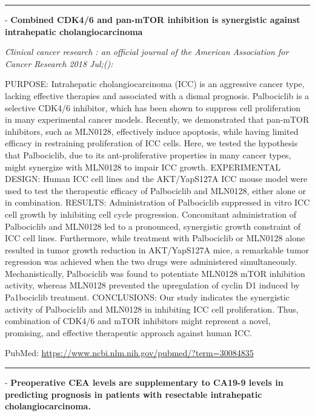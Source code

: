 \documentclass[]{article}
\begin{document}
\begin{center}\rule{0.5\linewidth}{\linethickness}\end{center}

 - \textbf{Combined CDK4/6 and pan-mTOR inhibition is synergistic
against intrahepatic cholangiocarcinoma}

\emph{Clinical cancer research : an official journal of the American
Association for Cancer Research 2018 Jul;():}

PURPOSE: Intrahepatic cholangiocarcinoma (ICC) is an aggressive cancer
type, lacking effective therapies and associated with a dismal
prognosis. Palbociclib is a selective CDK4/6 inhibitor, which has been
shown to suppress cell proliferation in many experimental cancer models.
Recently, we demonstrated that pan-mTOR inhibitors, such as MLN0128,
effectively induce apoptosis, while having limited efficacy in
restraining proliferation of ICC cells. Here, we tested the hypothesis
that Palbociclib, due to its ant-proliferative properties in many cancer
types, might synergize with MLN0128 to impair ICC growth. EXPERIMENTAL
DESIGN: Human ICC cell lines and the AKT/YapS127A ICC mouse model were
used to test the therapeutic efficacy of Palbociclib and MLN0128, either
alone or in combination. RESULTS: Administration of Palbociclib
suppressed in vitro ICC cell growth by inhibiting cell cycle
progression. Concomitant administration of Palbociclib and MLN0128 led
to a pronounced, synergistic growth constraint of ICC cell lines.
Furthermore, while treatment with Palbociclib or MLN0128 alone resulted
in tumor growth reduction in AKT/YapS127A mice, a remarkable tumor
regression was achieved when the two drugs were administered
simultaneously. Mechanistically, Palbociclib was found to potentiate
MLN0128 mTOR inhibition activity, whereas MLN0128 prevented the
upregulation of cyclin D1 induced by Pa1bociclib treatment. CONCLUSIONS:
Our study indicates the synergistic activity of Palbociclib and MLN0128
in inhibiting ICC cell proliferation. Thus, combination of CDK4/6 and
mTOR inhibitors might represent a novel, promising, and effective
therapeutic approach against human ICC.

PubMed: \url{https://www.ncbi.nlm.nih.gov/pubmed/?term=30084835}

{}

{}

\begin{center}\rule{0.5\linewidth}{\linethickness}\end{center}

 - \textbf{Preoperative CEA levels are supplementary to CA19-9 levels in
predicting prognosis in patients with resectable intrahepatic
cholangiocarcinoma.}
\end{document}
